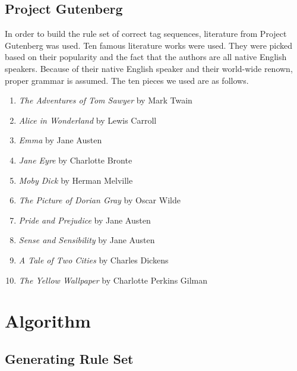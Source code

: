 \documentclass[11pt,a4paper]{article}
\begin{document}
\begin{multicols}{2}
\subsection{Project Gutenberg}
In order to build the rule set of correct tag sequences, literature from Project Gutenberg was used. \cite{gutenberg} Ten famous literature works were used. They were picked based on their popularity and the fact that the authors are all native English speakers. Because of their native English speaker and their world-wide renown, proper grammar is assumed. The ten pieces we used are as follows.

\begin{enumerate}
   \item \textit{The Adventures of Tom Sawyer} by Mark Twain
   \item \textit{Alice in Wonderland} by Lewis Carroll
   \item \textit{Emma} by Jane Austen
   \item \textit{Jane Eyre} by Charlotte Bronte
   \item \textit{Moby Dick} by Herman Melville
   \item \textit{The Picture of Dorian Gray} by Oscar Wilde
   \item \textit{Pride and Prejudice} by Jane Austen
   \item \textit{Sense and Sensibility} by Jane Austen
   \item \textit{A Tale of Two Cities} by Charles Dickens
   \item \textit{The Yellow Wallpaper} by Charlotte Perkins Gilman
\end{enumerate}

\section{Algorithm}


\subsection{Generating Rule Set}


\end{multicols}
\end{document}
